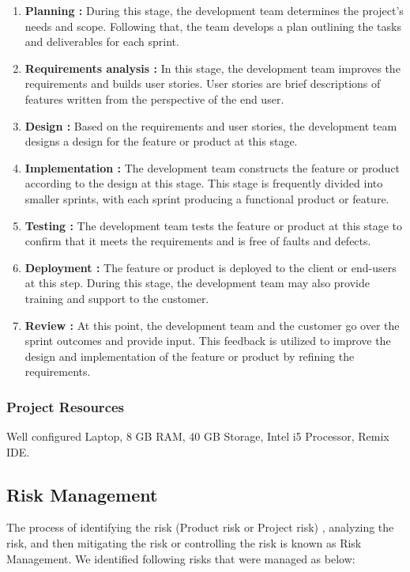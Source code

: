 \documentclass[oneside, 12pt]{book}
\begin{document}
				\begin{enumerate}
					\item \textbf{Planning :} During this stage, the development team determines the project's needs and scope. Following that, the team develops a plan outlining the tasks and deliverables for each sprint. 
					\item \textbf{Requirements analysis :} In this stage, the development team improves the requirements and builds user stories. User stories are brief descriptions of features written from the perspective of the end user.
					\item \textbf{Design :} Based on the requirements and user stories, the development team designs a design for the feature or product at this stage.
					\item \textbf{Implementation :} The development team constructs the feature or product according to the design at this stage. This stage is frequently divided into smaller sprints, with each sprint producing a functional product or feature.
					\item \textbf{Testing :} The development team tests the feature or product at this stage to confirm that it meets the requirements and is free of faults and defects.
					\item \textbf{Deployment :} The feature or product is deployed to the client or end-users at this step. During this stage, the development team may also provide training and support to the customer.
					\item \textbf{Review :} At this point, the development team and the customer go over the sprint outcomes and provide input. This feedback is utilized to improve the design and implementation of the feature or product by refining the requirements.
				\end{enumerate}
			\subsubsection{Project Resources}
				Well configured Laptop, 8 GB RAM, 40 GB Storage, Intel i5 Processor, Remix IDE.
		\subsection{Risk Management}
			The process of identifying the risk (Product risk or Project risk) , analyzing the risk, and then mitigating the risk or controlling the risk is known as Risk Management. We identified following risks that were managed as below:
\end{document}

